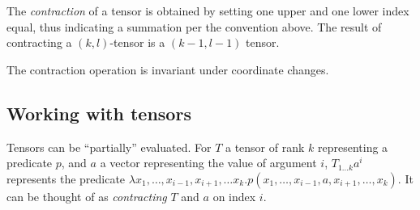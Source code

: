 The {\em contraction} of a tensor is obtained by setting one upper and one lower index equal, thus indicating a summation per the convention above. The result of contracting a \((k,l)\)-tensor  is a \((k-1,l-1)\) tensor.

The contraction operation is invariant under coordinate changes.


\subsection{Working with tensors}
  
Tensors can be ``partially'' evaluated. For \(T\) a tensor of rank \(k\) representing a predicate \(p\), and \(a\) a vector representing the value of argument \(i\), \(T_{1\ldots k}a^i\) represents the predicate \(\lambda x_1, \ldots, x_{i-1},x_{i+1},\ldots x_k. p(x_1, \ldots, x_{i-1}, a, x_{i+1}, \ldots, x_k)\). It can be thought of as {\em contracting} \(T\) and \(a\) on index \(i\).
  

